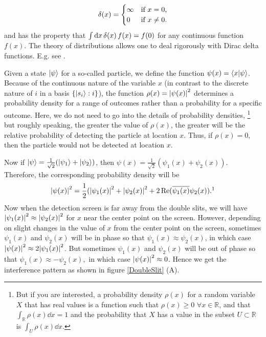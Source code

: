 \documentclass[letter, 12pt]{turabian-thesis}
\theoremstyle{hypothesis}
\let\origfootnote\footnote %
\renewcommand{\footnote}[1]{%
\noindent %
\origfootnote{#1}}
\begin{document}
{\begin{equation}
\var(x)=
\begin{cases} \infty & \text{if $x=0$,} \\
0 & \text{if $x\neq 0$}.
\end{cases}
\end{equation} and has the property that 
$\int \dd x \var(x) f(x) = f(0)$ for any continuous function $f(x)$. The theory of distributions allows one to deal rigorously with Dirac delta functions. E.g. see \cite[ch. 6]{Rudin}.  
}

 Given a state $\ket{\psi}$ for a so-called particle, we define the function $\psi(x)=\ip{x}{\psi}$. Because of the continuous nature of the variable $x$ (in contrast to the discrete nature of $i$ in a basis $\{\ket{s_i}:i\}$), the function $\rho(x)=\abs{\psi(x)}^2\label{rhodensity}$ determines a probability density for a range of outcomes rather than a probability for a specific outcome. Here, we do not need to go into the details of probability densities,\footnote{But if you are interested, a probability density $\rho(x)$ for a random variable $X$ that has real values is a function such that $\rho(x)\geq 0\, \,\forall x\in\mathbb{R}$, and that $\int_\mathbb{R} \rho(x) \dd x =1$ and the probability that $X$ has a value in the subset $U\subset\mathbb{R}$ is $\int_U \rho(x) \dd x $. } but roughly speaking, the greater the value of $\rho(x)$, the greater will be the relative probability of detecting the particle at location $x$. Thus, if $\rho(x)=0$, then the particle would not be detected at location $x$. 

Now if  $\ket{\psi}=\frac{1}{\sqrt{2}}(\ket{\psi_1}+\ket{\psi_2})$, then 
$\psi(x)=\frac{1}{\sqrt{2}}(\psi_1(x)+\psi_2(x)).$ Therefore, the corresponding probability density will be
\begin{equation*}\abs{\psi(x)}^2=\frac{1}{2}(\abs{\psi_1(x)}^2+\abs{\psi_2(x)}^2+2\Re(\overline{\psi_1(x)}\psi_2(x)).\protect\footnotemark
\end{equation*}
Now when the detection screen is far away from the double slits, we will have $\abs{\psi_1(x)}^2\approx \abs{\psi_2(x)}^2$ for $x$ near the center point on the screen. However, depending on slight changes in the value of $x$ from the center point on the screen, sometimes $\psi_1(x)$ and $\psi_2(x)$ will be in phase so that  $\psi_1(x)\approx\psi_2(x)$, in which case $\abs{\psi(x)}^2\approx 2\abs{\psi_1(x)}^2$. But sometimes $\psi_1(x)$ and $\psi_2(x)$ will be  out of phase so that $\psi_1(x)\approx-\psi_2(x),$ in which case $\abs{\psi(x)}^2\approx 0$. Hence we get the interference pattern as shown in figure \ref{DoubleSlit} (A).
\end{document}
